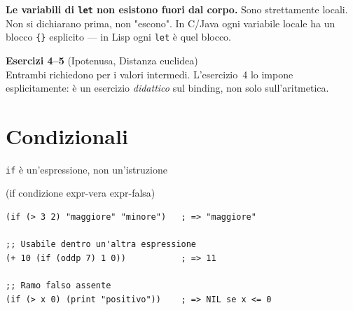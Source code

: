 \begin{attenzione}
\textbf{Le variabili di \texttt{let} non esistono fuori dal corpo.}
Sono strettamente locali. Non si dichiarano prima, non "escono".
In C/Java ogni variabile locale ha un blocco \texttt{\{\}} esplicito ---
in Lisp ogni \texttt{let} è quel blocco.
\end{attenzione}

\begin{workbook}
\textbf{Esercizi 4--5} (Ipotenusa, Distanza euclidea)\\[4pt]
Entrambi richiedono  per i valori intermedi.
L'esercizio~4 lo impone esplicitamente: è un esercizio
\emph{didattico} sul binding, non solo sull'aritmetica.
\end{workbook}

\section{Condizionali}


\begin{concetto}{\texttt{if} è un'espressione, non un'istruzione}

\begin{sintassi}
(if condizione expr-vera expr-falsa)
\end{sintassi}


\boxsep
{}
\end{concetto}

\begin{esempio}
\begin{lstlisting}
(if (> 3 2) "maggiore" "minore")   ; => "maggiore"

;; Usabile dentro un'altra espressione
(+ 10 (if (oddp 7) 1 0))           ; => 11

;; Ramo falso assente
(if (> x 0) (print "positivo"))    ; => NIL se x <= 0
\end{lstlisting}
\end{esempio}

